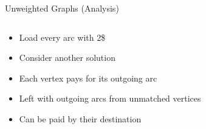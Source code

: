 \begin{frame}{Unweighted Graphs (Analysis)}
\begin{columns}
\begin{column}{.5\textwidth}
\begin{itemize}
  \item<1> Load every arc with 2\$
  \item<3> Consider another solution
  \item<4> Each vertex pays for its outgoing arc
  \item<5> Left with outgoing arcs from unmatched vertices 
  \item<6> Can be paid by their destination 
\end{itemize}
\end{column}
\begin{column}{.5\textwidth}
\centering

\end{column}
\end{columns}
\end{frame}